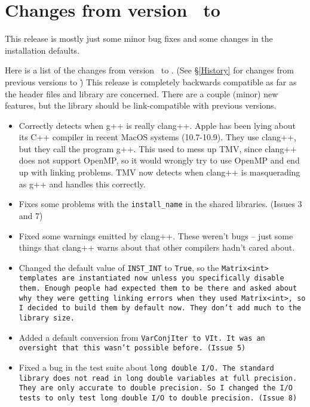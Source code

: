 
\section{Changes from version \prevtmvversion\ to \tmvversion}
\label{Changes}

This release is mostly just some minor bug fixes and some changes in the 
installation defaults.

Here is a list of the changes from version \prevtmvversion\ to \tmvversion.  
(See \S\ref{History} for changes from previous versions to \prevtmvversion\.)
This release is completely backwards compatible as far as the header files and library are 
concerned.  There are a couple (minor) new features, but the library should be link-compatible
with previous versions.

\begin{itemize}

\item
Correctly detects when g++ is really clang++.  Apple has been lying about
its C++ compiler in recent MacOS systems (10.7-10.9).  They use clang++,
but they call the program g++.  This used to mess up TMV, since clang++ 
does not support OpenMP, so it would wrongly try to use OpenMP and end up 
with linking problems.  TMV now detects when clang++ is masquerading as
g++ and handles this correctly.

\item
Fixes some problems with the \texttt{install\_name} in the shared libraries.  
(Issues 3 and 7)

\item
Fixed some warnings emitted by clang++.  These weren't bugs -- just some
things that clang++ warns about that other compilers hadn't cared about.

\item
Changed the default value of \texttt{INST\_INT} to \texttt{True}, so the \tt{Matrix<int>}
templates are instantiated now unless you specifically disable them.  Enough people
had expected them to be there and asked about why they were getting 
linking errors when they used \tt{Matrix<int>}, so I decided to build them
by default now.  They don't add much to the library size.

\item
Added a default conversion from \tt{VarConjIter} to \tt{VIt}.  It was an oversight
that this wasn't possible before.  (Issue 5)

\item 
Fixed a bug in the test suite about \tt{long double} I/O.  The standard library does
not read in \tt{long double} variables at full precision.  They are only accurate to
double precision.  So I changed the I/O tests to only test \tt{long double} I/O
to double precision.  (Issue 8)

\end{itemize}
